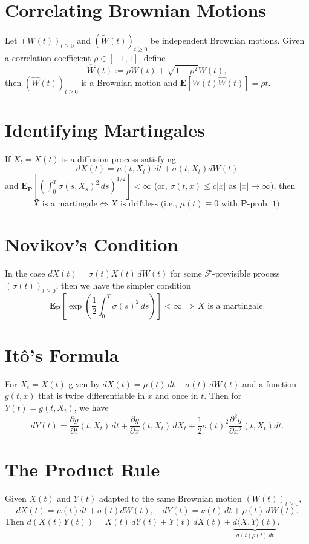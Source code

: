 \documentclass[twocolumn]{amsart}
\renewcommand{\P}{\mathbf{P}}
\newcommand{\E}{\mathbf{E}}
\newcommand{\EP}{\mathbf{E}_\mathbf{P}}
\newcommand{\F}{\mathcal{F}}
\newcommand{\QV}[1]{\langle#1\rangle}
\newcommand{\tW}{\widetilde W}
\begin{document}
\section*{Correlating Brownian Motions}
Let $(W(t))_{t \ge 0}$ and $(\tW(t))_{t \ge 0}$ be independent Brownian motions. Given a correlation coefficient $\rho \in [-1,1]$, define
\begin{equation*}
    \widehat W(t) := \rho W(t) + \sqrt{1-\rho^2} \tW(t),
\end{equation*}
then $(\widehat W(t))_{t \ge 0}$ is a Brownian motion and $\E[W(t) \widehat W(t)] = \rho t$.

\section*{Identifying Martingales}

If $X_t = X(t)$ is a diffusion process satisfying $$dX(t) = \mu(t,X_t)\,dt + \sigma(t,X_t) dW(t)$$ and $\EP[(\int_0^T \sigma(s,X_s)^2\,ds)^{1/2}] < \infty$ (or, $\sigma(t,x) \le c |x|$ as $|x| \to \infty$), then
\[ X \text{ is a martingale} \iff X \text{ is driftless (i.e., $\mu(t) \equiv 0$ with $\P$-prob. 1).} \]

\section*{Novikov's Condition}

In the case $dX(t) = \sigma(t) X(t)\,dW(t)$ for some $\F$-previsible process $(\sigma(t))_{t \ge 0}$, then we have the simpler condition
\[ \EP \left[ \exp\left(\frac{1}{2} \int_0^T \sigma(s)^2\,ds\right) \right] < \infty\, \Rightarrow \, X \text{ is a martingale}. \]


\section*{It\^o's Formula}
For $X_t=X(t)$ given by $dX(t) = \mu(t)\,dt + \sigma(t)\,dW(t)$ and a function $g(t,x)$ that is twice differentiable in $x$ and once in $t$. Then for $Y(t) = g(t,X_t)$, we have
\[
dY(t) = \frac{\partial g}{\partial t}(t,X_t)\,dt + \frac{\partial g}{\partial x}(t,X_t)\,dX_t + \frac{1}{2} \sigma(t)^2 \frac{\partial ^2 g}{\partial x^2}(t,X_t)dt.
\]

\section*{The Product Rule}
Given $X(t)$ and $Y(t)$ adapted to the same Brownian motion $(W(t))_{t \ge 0}$,
\[
    dX(t) = \mu(t)dt +\sigma(t)dW(t), \quad
    dY(t) = \nu(t)\,dt + \rho(t)\,dW(t).
\]
Then $d(X(t) Y(t)) = X(t)\,d Y(t) + Y(t)\,dX(t) + \underbrace{d\QV{X,Y}(t)}_{\sigma(t) \rho(t)\,dt}$.
\end{document}
